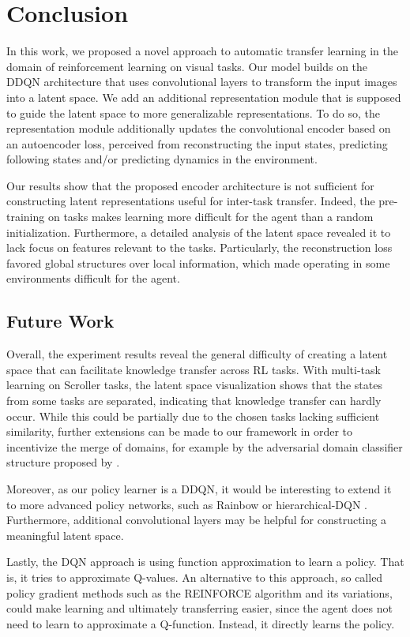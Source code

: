 \section{Conclusion}
\label{sec:conclusion}

In this work, we proposed a novel approach to automatic transfer learning in the domain of reinforcement learning on visual tasks. Our model builds on the DDQN architecture \citep{DDQN} that uses convolutional layers to transform the input images into a latent space. We add an additional representation module that is supposed to guide the latent space to more generalizable representations. To do so, the representation module additionally updates the convolutional encoder based on an autoencoder loss, perceived from reconstructing the input states, predicting following states and/or predicting dynamics in the environment.

Our results show that the proposed encoder architecture is not sufficient for constructing latent representations useful for inter-task transfer. Indeed, the pre-training on tasks makes learning more difficult for the agent than a random initialization. Furthermore, a detailed analysis of the latent space revealed it to lack focus on features relevant to the tasks. Particularly, the reconstruction loss favored global structures over local information, which made operating in some environments difficult for the agent.

\subsection{Future Work}
\label{subsec:futurework}
Overall, the experiment results reveal the general difficulty of creating a latent space that can facilitate knowledge transfer across RL tasks.
With multi-task learning on Scroller tasks, the latent space visualization shows that the states from some tasks are separated, indicating that knowledge transfer can hardly occur.
While this could be partially due to the chosen tasks lacking sufficient similarity, further extensions can be made to our framework in order to incentivize the merge of domains, for example by the adversarial domain classifier structure proposed by \citet{ganin2014unsupervised}.

Moreover, as our policy learner is a DDQN, it would be interesting to extend it to more advanced policy networks, such as Rainbow \citep{rainbow} or hierarchical-DQN \citep{hierarchical_dqn}.
Furthermore, additional convolutional layers may be helpful for constructing a meaningful latent space. 

Lastly, the DQN approach is using function approximation to learn a policy. That is, it tries to approximate Q-values. An alternative to this approach, so called policy gradient methods such as the REINFORCE algorithm \citep{williams1992simple} and its variations, could make learning and ultimately transferring easier, since the agent does not need to learn to approximate a Q-function. Instead, it directly learns the policy.
